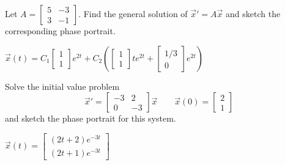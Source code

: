 \begin{exercise}
Let
$A = \left[ \begin{smallmatrix} 5 & -3 \\ 3 & -1 \end{smallmatrix} \right]$.
Find the general solution of ${\vec{x}}' = A \vec{x}$ and sketch the corresponding phase portrait.
\end{exercise}
\comboSol{%
}
{%
$\vec{x}(t) = C_1 \left[\begin{smallmatrix}  1\\ 1 \end{smallmatrix}\right]e^{2t} + C_2\left( \left[\begin{smallmatrix} 1\\1 \end{smallmatrix}\right]te^{2t} + \left[\begin{smallmatrix} 1/3 \\ 0 \end{smallmatrix}\right]e^{2t}\right)$ \hfill{}\hfill\hfill
}

\begin{exercise}
Solve the initial value problem
\[ {\vec{x}}' = \begin{bmatrix} -3 & 2 \\ 0 & -3 \end{bmatrix} \vec{x} \qquad \vec{x}(0) = \begin{bmatrix} 2 \\ 1 \end{bmatrix} \] and sketch the phase portrait for this system.
\end{exercise}
\comboSol{%
}
{%
$\vec{x}(t) = \left[\begin{smallmatrix} (2t+2)e^{-3t} \\ (2t+1)e^{-3t} \end{smallmatrix}\right]$ \hfill{}\hfill\hfill
}


